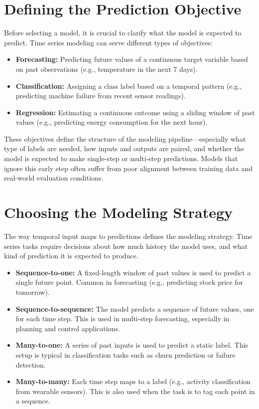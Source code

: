 \documentclass[12pt,openany]{book}
\begin{document}
\section{Defining the Prediction Objective}

Before selecting a model, it is crucial to clarify what the model is expected to predict. Time series modeling can serve different types of objectives:

\begin{itemize}
    \item \textbf{Forecasting:} Predicting future values of a continuous target variable based on past observations (e.g., temperature in the next 7 days).
    \item \textbf{Classification:} Assigning a class label based on a temporal pattern (e.g., predicting machine failure from recent sensor readings).
    \item \textbf{Regression:} Estimating a continuous outcome using a sliding window of past values (e.g., predicting energy consumption for the next hour).
\end{itemize}

These objectives define the structure of the modeling pipeline—especially what type of labels are needed, how inputs and outputs are paired, and whether the model is expected to make single-step or multi-step predictions. Models that ignore this early step often suffer from poor alignment between training data and real-world evaluation conditions.


\section{Choosing the Modeling Strategy}

The way temporal input maps to predictions defines the modeling strategy. Time series tasks require decisions about how much history the model uses, and what kind of prediction it is expected to produce.

\begin{itemize}
    \item \textbf{Sequence-to-one:} A fixed-length window of past values is used to predict a single future point. Common in forecasting (e.g., predicting stock price for tomorrow).
    
    \item \textbf{Sequence-to-sequence:} The model predicts a sequence of future values, one for each time step. This is used in multi-step forecasting, especially in planning and control applications.

    \item \textbf{Many-to-one:} A series of past inputs is used to predict a static label. This setup is typical in classification tasks such as churn prediction or failure detection.

    \item \textbf{Many-to-many:} Each time step maps to a label (e.g., activity classification from wearable sensors). This is also used when the task is to tag each point in a sequence.
\end{itemize}
\end{document}
